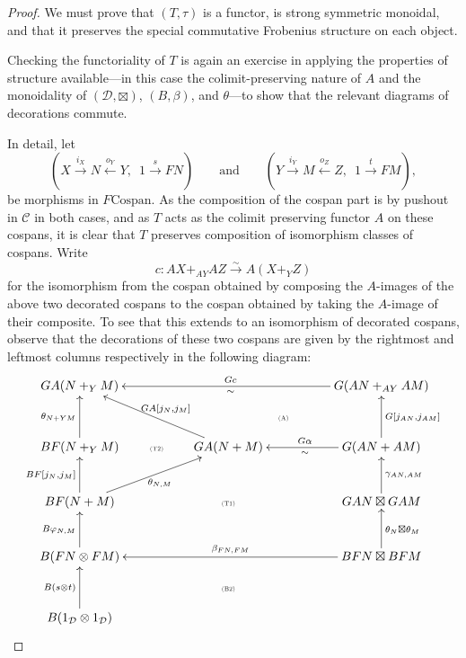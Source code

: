 \begin{proof}
  We must prove that $(T,\tau)$ is a functor, is strong symmetric monoidal, and
  that it preserves the special commutative Frobenius structure on each object.

  Checking the functoriality of $T$ is again an exercise in applying the
  properties of structure available---in this case the colimit-preserving nature
  of $A$ and the monoidality of $(\mathcal D,\boxtimes)$, $(B,\beta)$, and
  $\theta$---to show that the relevant diagrams of decorations commute. 
  
  In detail, let 
\[
  (X \stackrel{i_X}\longrightarrow N \stackrel{o_Y}\longleftarrow Y, \enspace 1
  \stackrel{s}\longrightarrow FN)
  \qquad \mbox{and} \qquad
  (Y \stackrel{i_Y}\longrightarrow M \stackrel{o_Z}\longleftarrow Z, \enspace 1
  \stackrel{t}\longrightarrow FM), 
\]
be morphisms in $F\mathrm{Cospan}$. As the composition of the cospan part is by
pushout in $\mathcal C$ in both cases, and as $T$ acts as the colimit preserving
functor $A$ on these cospans, it is clear that $T$ preserves composition of
isomorphism classes of cospans. Write
\[
  c\colon  AX+_{AY}AZ \stackrel\sim\longrightarrow A(X+_YZ)
\]
for the isomorphism from the cospan obtained by composing the $A$-images of the
above two decorated cospans to the cospan obtained by taking the $A$-image of their
composite. To see that this extends to an isomorphism of decorated cospans,
observe that the decorations of these two cospans are given by the rightmost and
leftmost columns respectively in the following diagram:
\[
  \xymatrixcolsep{.5pc}
  \xymatrixrowsep{.9pc}
  \xymatrix{ 
    GA(N+_YM) &&&&&&&& \ar[llllllll]_{Gc}^{\sim} G(AN+_{AY}AM) \\
    &&&&& \textsc{\tiny(A)} \\
    BF(N+_YM) \ar[uu]^{\theta_{N+YM}} && \textsc{\tiny(T2)} && GA(N+M)
    \ar[uullll]_{GA[j_N,j_M]} &&&& G(AN+AM) \ar[uu]_{G[j_{AN},j_{AM}]}
    \ar[llll]^{\sim}_{G\alpha} \\
    \\
    BF(N+M) \ar[uu]^{BF[j_N,j_M]} \ar[uurrrr]_{\theta_{N,M}} &&&&
    \textsc{\tiny(T1)} &&&& GAN \boxtimes GAM \ar[uu]_{\gamma_{AN,AM}} \\
    \\
    B(FN \otimes FM) \ar[uu]^{B\varphi_{N,M}} &&&&&&&& BFN \boxtimes BFM
    \ar[uu]_{\theta_N \boxtimes \theta_M} \ar[llllllll]_{\beta_{FN,FM}} \\
    &&&& \textsc{\tiny(B2)} \\
    B(1_{\mathcal D} \otimes 1_{\mathcal D}) \ar[uu]^{B(s \otimes t)} &&&&&&&&
}\]
\end{proof}
